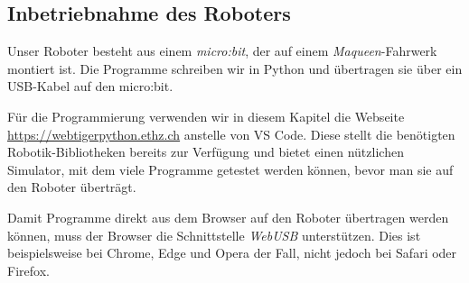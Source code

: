 \subsection*{Inbetriebnahme des Roboters}

Unser Roboter besteht aus einem \emph{micro:bit}, der auf
einem \emph{Maqueen}-Fahrwerk montiert ist. Die Programme
schreiben wir in Python und übertragen sie über ein
USB-Kabel auf den micro:bit.


\begin{myremark}
    Für die Programmierung verwenden wir in diesem Kapitel
    die Webseite \url{https://webtigerpython.ethz.ch}
    anstelle von VS Code. Diese stellt die benötigten
    Robotik-Bibliotheken bereits zur Verfügung und bietet
    einen nützlichen Simulator, mit dem viele Programme
    getestet werden können, bevor man sie auf den
    Roboter überträgt.

    Damit Programme direkt aus dem Browser auf den Roboter
    übertragen werden können, muss der Browser die
    Schnittstelle \emph{WebUSB} unterstützen. Dies ist
    beispielsweise bei Chrome, Edge und Opera der Fall,
    nicht jedoch bei Safari oder Firefox.
\end{myremark}





